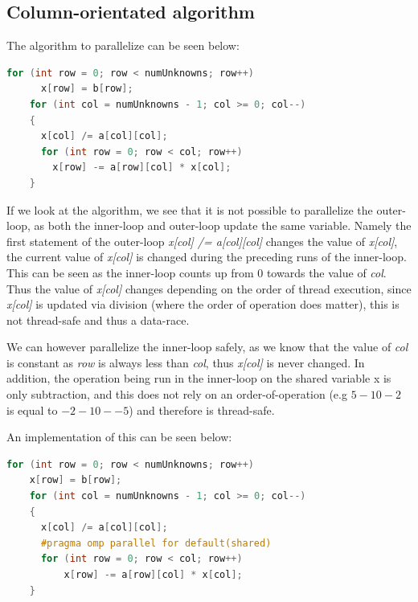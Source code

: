   \subsection{Column-orientated algorithm}
  The algorithm to parallelize can be seen below:
  \begin{lstlisting}[language=C++]
    for (int row = 0; row < numUnknowns; row++)
      x[row] = b[row];
    for (int col = numUnknowns - 1; col >= 0; col--)
    {
      x[col] /= a[col][col];
      for (int row = 0; row < col; row++)
        x[row] -= a[row][col] * x[col];
    }
  \end{lstlisting}

  If we look at the algorithm, we see that it is not possible to parallelize the outer-loop, as both the inner-loop and outer-loop update the same variable. 
  Namely the first statement of the outer-loop \textit{x[col] /= a[col][col]} changes the value of \textit{x[col]}, the current value of \textit{x[col]} is changed during the preceding runs
  of the inner-loop. This can be seen as the inner-loop counts up from 0 towards the value of \textit{col}. Thus the value of \textit{x[col]} changes depending on the order of thread execution,
  since \textit{x[col]} is updated via division (where the order of operation does matter), this is not thread-safe and thus a data-race. 


  We can however parallelize the inner-loop safely, as we know that the value of \textit{col} is constant as \textit{row} is always less than \textit{col}, thus \textit{x[col]} is never changed.
  In addition, the operation being run in the inner-loop on the shared variable x is only subtraction, and this does not rely on an order-of-operation (e.g $5-10-2$ is equal to $-2-10--5$) and 
  therefore is thread-safe. 

  An implementation of this can be seen below:
  \begin{lstlisting}[language=C++]
    for (int row = 0; row < numUnknowns; row++)
    x[row] = b[row];
    for (int col = numUnknowns - 1; col >= 0; col--)
    {
      x[col] /= a[col][col];
      #pragma omp parallel for default(shared)  
      for (int row = 0; row < col; row++)
          x[row] -= a[row][col] * x[col];
    }
  \end{lstlisting}

